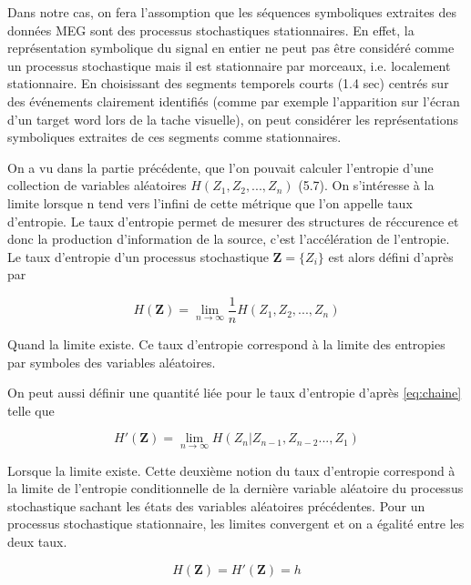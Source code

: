 Dans notre cas, on fera l'assomption que les séquences symboliques extraites des données MEG sont des processus stochastiques stationnaires. En effet, la représentation symbolique du signal en entier ne peut pas être considéré comme un processus stochastique mais il est stationnaire par morceaux, i.e. localement stationnaire. En choisissant des segments temporels courts (1.4 sec) centrés sur des événements clairement identifiés (comme par exemple l'apparition sur l'écran d'un target word lors de la tache visuelle), on peut considérer les représentations symboliques extraites de ces segments comme stationnaires.

On a vu dans la partie précédente, que l'on pouvait calculer l'entropie d'une collection de variables aléatoires $H(Z_1, Z_2, ...,Z_n)$ (5.7). On s'intéresse à la limite lorsque n tend vers l'infini de cette métrique que l'on appelle taux d'entropie. Le taux d'entropie permet de mesurer des structures de réccurence et donc la production d'information de la source, c'est l'accélération de l'entropie.
Le taux d'entropie d'un processus stochastique  $\textbf{Z}=\{Z_i \}$ est alors défini d'après \cite{2} par

\begin{equation}
    H(\textbf{Z})=\lim_{n \to \infty}\frac{1}{n}H(Z_1, Z_2, ...,Z_n) \label{eq:taux1}
\end{equation}

Quand la limite existe. 
Ce taux d'entropie correspond à la limite des entropies par symboles des variables aléatoires. 

On peut aussi définir une quantité liée pour le taux d'entropie \cite{2} d'après \eqref{eq:chaine} telle que 

\begin{equation}
    H'(\textbf{Z})=\lim_{n \to \infty} H(Z_n|Z_{n-1},Z_{n-2}...,Z_1) \label{eq:taux2}
\end{equation}

Lorsque la limite existe.
Cette deuxième notion du taux d'entropie correspond à la limite de l'entropie conditionnelle de la dernière variable aléatoire du processus stochastique sachant les états des variables aléatoires précédentes.
Pour un processus stochastique stationnaire, les limites convergent et on a égalité entre les deux taux.

\begin{equation}
    H(\textbf{Z}) = H'(\textbf{Z}) = h \label{eq:convergence1}
\end{equation}

